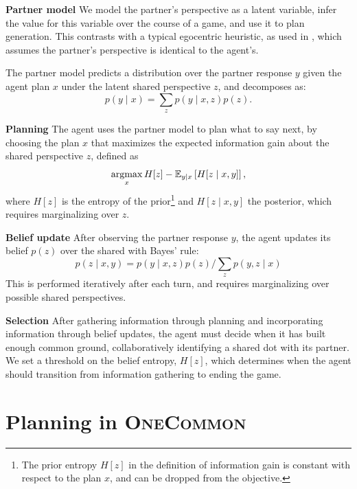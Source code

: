 \documentclass[11pt]{article}
\newcommand{\daniel}[1]{{{\textcolor{red}{(Daniel: #1)}}}}
\begin{document}
\noindent \textbf{Partner model}
We model the partner's perspective as a latent variable, infer the value for this variable over the course of a game, and use it to plan generation.
This contrasts with a typical egocentric heuristic, as used in \citet{fried}, which assumes the partner's perspective
is identical to the agent's.

The partner model predicts a distribution over the partner response $y$ given the agent plan $x$ under the latent shared perspective $z$, and decomposes as:
$$p(y \mid x) = \sum_z p(y \mid x,z)p(z).$$


\noindent  \textbf{Planning}
The agent uses the partner model to plan
what to say next, by choosing
the plan $x$ that maximizes the expected information gain  \citep{lindley} about the shared perspective $z$,
defined as
$$\operatorname*{argmax}_x H[z] - \mathbb{E}_{y \mid x}\left[H[z \mid x,y]\right],$$
where $H[z]$ is the entropy of the prior\footnote{The prior entropy $H[z]$ in the definition of information gain is constant with respect to
the plan $x$, and can be dropped from the objective.}
 and $H[z\mid x,y]$ the posterior,
which requires marginalizing over $z$.


\noindent \textbf{Belief update}
After observing the partner response $y$, the agent updates its belief $p(z)$ over the shared
with Bayes' rule:
$$p(z \mid x, y) = p(y \mid x,z)p(z) / \sum_z p(y,z \mid x)$$
This is performed iteratively after each turn,
and requires marginalizing over possible shared perspectives.

\noindent \textbf{Selection}
After gathering information through planning and
incorporating information through belief updates,
the agent must decide when it has built enough common ground, collaboratively identifying a shared dot with its partner.
We set a threshold on the belief entropy, $H[z]$,
which determines when the agent should transition
from information gathering to ending the game.

\section{Planning in \textsc{OneCommon}}
\label{sec:plan-oc}
\end{document}
